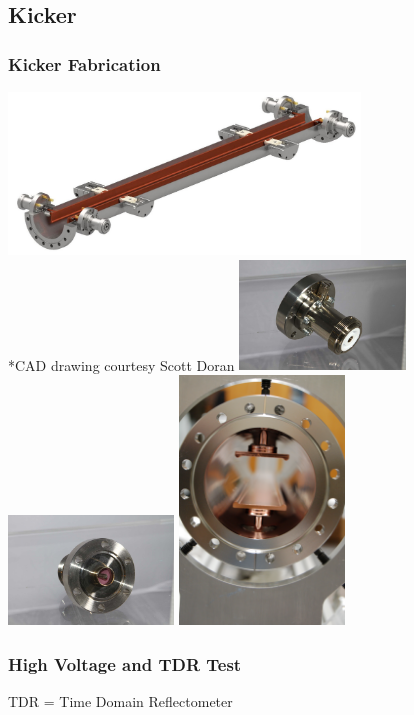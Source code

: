 \documentclass[professionalfonts,t]{beamer}
\begin{document}
{\subsection{Kicker}
\begin{frame}
	\frametitle{Kicker Fabrication}
	\centering
	\includegraphics[width=0.7\textwidth]{../../tex/images/kicker}\\
	\tiny{*CAD drawing courtesy Scott Doran}
	\vspace{1em}
	\includegraphics[width=0.33\textwidth]{../../tex/images/FID_feedthrough1}%
	\includegraphics[width=0.33\textwidth]{../../tex/images/FID_feedthrough2}%
	\includegraphics[width=0.33\textwidth]{../../tex/images/kicker_plates}
\end{frame}

\begin{frame}
	\frametitle{High Voltage and TDR Test}
	TDR = Time Domain Reflectometer
	\vspace{1em}
	

\end{frame}}
\end{document}

